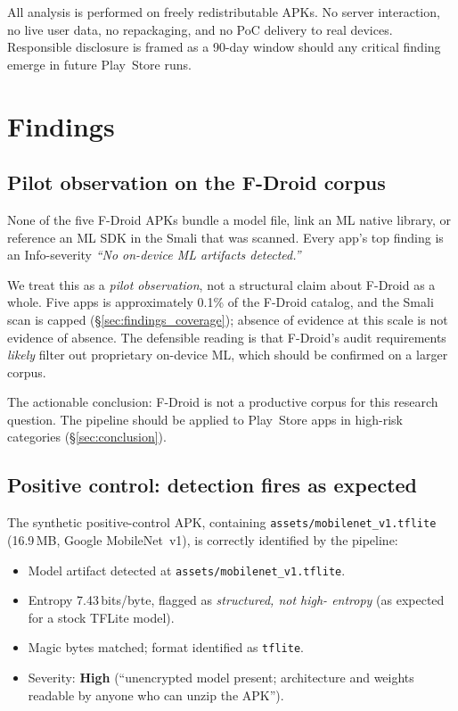 \documentclass[conference]{IEEEtran}
\begin{document}
All analysis is performed on freely redistributable APKs. No server
interaction, no live user data, no repackaging, and no PoC delivery
to real devices. Responsible disclosure is framed as a 90-day window
should any critical finding emerge in future Play~Store runs.

\section{Findings}
\label{sec:findings}

\subsection{Pilot observation on the F-Droid corpus}

None of the five F-Droid APKs bundle a model file, link an ML native
library, or reference an ML SDK in the Smali that was scanned. Every
app's top finding is an Info-severity \emph{``No on-device ML
artifacts detected.''}

We treat this as a \emph{pilot observation}, not a structural claim
about F-Droid as a whole. Five apps is approximately 0.1\% of the
F-Droid catalog, and the Smali scan is capped
(\S\ref{sec:findings_coverage}); absence of evidence at this scale is
not evidence of absence. The defensible reading is that F-Droid's
audit requirements \emph{likely} filter out proprietary on-device ML,
which should be confirmed on a larger corpus.

The actionable conclusion: F-Droid is not a productive corpus for
this research question. The pipeline should be applied to Play~Store
apps in high-risk categories (\S\ref{sec:conclusion}).

\subsection{Positive control: detection fires as expected}

The synthetic positive-control APK, containing
\texttt{assets/mobilenet\_v1.tflite} (16.9\,MB, Google MobileNet~v1),
is correctly identified by the pipeline:

\begin{itemize}
\item Model artifact detected at \texttt{assets/mobilenet\_v1.tflite}.
\item Entropy 7.43\,bits/byte, flagged as \emph{structured, not high-
  entropy} (as expected for a stock TFLite model).
\item Magic bytes matched; format identified as \texttt{tflite}.
\item Severity: \textbf{High} (``unencrypted model present;
  architecture and weights readable by anyone who can unzip the
  APK'').
\end{itemize}
\end{document}

